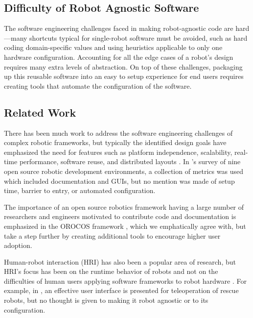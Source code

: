\documentclass[10pt,journal,compsoc]{joser1}
\begin{document}
{%
\subsection{Difficulty of Robot Agnostic Software}

The software engineering challenges faced in making robot-agnostic code are hard---many shortcuts typical for single-robot software must be avoided, such as hard coding domain-specific values and using heuristics applicable to only one hardware configuration. Accounting for all the edge cases of a robot's design requires many extra levels of abstraction. On top of these challenges, packaging up this reusable software into an easy to setup experience for end users requires creating tools that automate the configuration of the software.

\subsection{Related Work}

There has been much work to address the software engineering challenges of complex robotic frameworks, but typically the identified design goals have emphasized the need for features such as platform independence, scalability, real-time performance, software reuse, and distributed layouts \cite{realtime_framework, collett2005player, kramer2007development}. In \cite{kramer2007development}'s survey of nine open source robotic development environments, a collection of metrics was used which included documentation and GUIs, but no mention was made of setup time, barrier to entry, or automated configuration.

The importance of an open source robotics framework having a large number of researchers and engineers motivated to contribute code and documentation is emphasized in the OROCOS framework \cite{bruyninckx2001open}, which we emphatically agree with, but take a step further by creating additional tools to encourage higher user adoption.
  
Human-robot interaction (HRI) has also been a popular area of research, but HRI's focus has been on the runtime behavior of robots and not on the difficulties of human users applying software frameworks to robot hardware \cite{hci_metrics, yancotaxonomy, goodrichseven}. For example, in \cite{rescueRobots}, an effective user interface is presented for teleoperation of rescue robots, but no thought is given to making it robot agnostic or to its configuration. 

}
\end{document}
